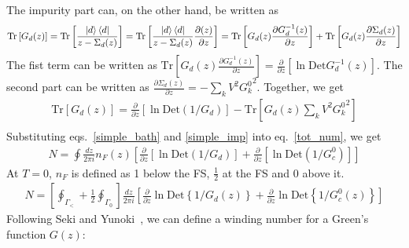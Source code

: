 \documentclass[10pt]{report}
\numberwithin{equation}{section}
\begin{document}
The impurity part can, on the other hand, be written as
\begin{equation}\begin{aligned}
	\text{Tr}\left[G_{d}(z)\right] &= \text{Tr}\left[ \frac{\ket{d}\bra{d}}{z - \Sigma_d(z)}\right] = \text{Tr}\left[ \frac{\ket{d}\bra{d}}{z - \Sigma_d(z)}\frac{\partial{\left(z\right)}}{\partial{z}} \right] = \text{Tr}\left[ G_{d}(z)\frac{\partial{G_{d}^{-1}(z)}}{\partial{z}} \right] + \text{Tr}\left[ G_{d}(z)\frac{\partial{\Sigma_d(z)}}{\partial{z}} \right]\\
\end{aligned}\end{equation}
The fist term can be written as \(\text{Tr}\left[ G_{d}(z)\frac{\partial{G_{d}^{-1}(z)}}{\partial{z}} \right] = \frac{\partial{}}{\partial{z}}\left[\ln \text{Det}G_{d}^{-1}(z)\right]\). The second part can be written as \(\frac{\partial{\Sigma_d(z)}}{\partial{z}} = -\sum_k V^2 {G_k^0}^2\). Together, we get
\begin{equation}\begin{aligned}
	\label{simple_imp}
	\text{Tr}\left[G_{d}(z)\right] = \frac{\partial{}}{\partial{z}}\left[\ln \text{Det}\left(1/G_{d}\right)\right] - \text{Tr}\left[ G_{d}(z)\sum_k V^2 {G_k^0}^2\right]\\
\end{aligned}\end{equation}
Substituting eqs.~\ref{simple_bath} and \ref{simple_imp} into eq.~\ref{tot_num}, we get
\begin{equation}\begin{aligned}
	N = \oint \frac{dz}{2\pi i}n_F(z) \left[\frac{\partial{}}{\partial{z}}\left[\ln \text{Det}\left(1/G_{d}\right)\right] + \frac{\partial{}}{\partial{z}}\left[\ln \text{Det}\left(1/G_{c}^{0}\right)\right]\right]
\end{aligned}\end{equation}
At \(T=0\), \(n_F\) is defined as 1 below the FS, \(\frac{1}{2}\) at the FS and 0 above it.
\begin{equation}\begin{aligned}
N  = \left[\oint_{\Gamma_<} + \frac{1}{2}\oint_{\Gamma_0}\right]\frac{dz}{2\pi i}\left[\frac{\partial{}}{\partial{z}} \ln \text{Det} \left\{1/G_d(z)\right\} + \frac{\partial{}}{\partial{z}} \ln \text{Det} \left\{1/G_{c}^{0}(z)\right\} \right]
\end{aligned}\end{equation}
Following Seki and Yunoki~\cite{seki2017topological}, we can define a winding number for a Green's function \(G(z)\):
\end{document}
